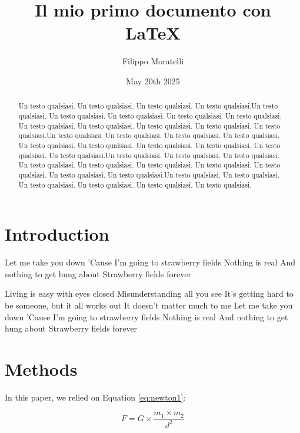 \documentclass{article}
\title{Il mio primo documento con LaTeX}
\author{Filippo Moratelli}
\date{May 20th 2025}
\begin{document}
\maketitle

\tableofcontents

\begin{abstract}
Un testo qualsiasi. Un testo qualsiasi. Un testo qualsiasi. Un testo qualsiasi.Un testo qualsiasi. Un testo qualsiasi. Un testo qualsiasi. Un testo qualsiasi. Un testo qualsiasi. Un testo qualsiasi. Un testo qualsiasi. Un testo qualsiasi. Un testo qualsiasi. Un testo qualsiasi.Un testo qualsiasi. Un testo qualsiasi. Un testo qualsiasi. Un testo qualsiasi. Un testo qualsiasi. Un testo qualsiasi. Un testo qualsiasi. Un testo qualsiasi. Un testo qualsiasi. Un testo qualsiasi.Un testo qualsiasi. Un testo qualsiasi. Un testo qualsiasi. Un testo qualsiasi. Un testo qualsiasi. Un testo qualsiasi. Un testo qualsiasi. Un testo qualsiasi. Un testo qualsiasi. Un testo qualsiasi.Un testo qualsiasi. Un testo qualsiasi. Un testo qualsiasi. Un testo qualsiasi. Un testo qualsiasi. Un testo qualsiasi. 
\end{abstract}

\section{Introduction} \label{sec:intro}
Let me take you down
'Cause I'm going to strawberry fields
Nothing is real
And nothing to get hung about
Strawberry fields forever

\smallskip
Living is easy with eyes closed
Misunderstanding all you see
It's getting hard to be someone, but it all works out
It doesn't matter much to me
Let me take you down
'Cause I'm going to strawberry fields
Nothing is real
And nothing to get hung about
Strawberry fields forever

\section{Methods}
In this paper, we relied on Equation \ref{eq:newton1}:

\begin{equation}
F = G \times \frac{m_1 \times m_2}{d^2}
\label{eq:newton1}
\end{equation}
\end{document}
